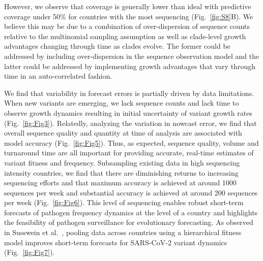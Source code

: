 However, we observe that coverage is generally lower than ideal with predictive coverage under 50\% for countries with the most sequencing (Fig.~\ref{fig:S8}B).
We believe this may be due to a combination of over-dispersion of sequence counts relative to the multinomial sampling assumption as well as clade-level growth advantages changing through time as clades evolve.
The former could be addressed by including over-dispersion in the sequence observation model and the latter could be addressed by implementing growth advantages that vary through time in an auto-correlated fashion.


We find that variability in forecast errors is partially driven by data limitations.
When new variants are emerging, we lack sequence counts and lack time to observe growth dynamics resulting in initial uncertainty of variant growth rates (Fig.~\ref{fig:Fig3}).
Relatedly, analyzing the variation in nowcast error, we find that overall sequence quality and quantity at time of analysis are associated with model accuracy (Fig.~\ref{fig:Fig5}).
Thus, as expected, sequence quality, volume and turnaround time are all important for providing accurate, real-time estimates of variant fitness and frequency.
Subsampling existing data in high sequencing intensity countries, we find that there are diminishing returns to increasing sequencing efforts and that maximum accuracy is achieved at around 1000 sequences per week and substantial accuracy is achieved at around 200 sequences per week (Fig.~\ref{fig:Fig6}).
This level of sequencing enables robust short-term forecasts of pathogen frequency dynamics at the level of a country and highlights the feasibility of pathogen surveillance for evolutionary forecasting.
As observed in Susswein et al.\ \cite{susswein2023leveraging}, pooling data across countries using a hierarchical fitness model improves short-term forecasts for SARS-CoV-2 variant dynamics (Fig.~\ref{fig:Fig7}).

